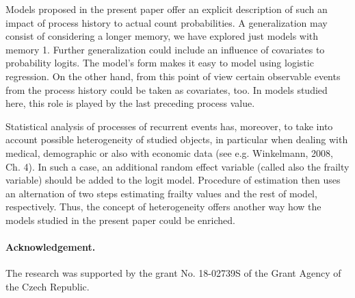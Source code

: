 \documentclass[11pt]{article}
\begin{document}
Models proposed in the present paper offer an explicit description
of such an impact of process history to actual count
probabilities. A generalization may consist of considering a
longer memory, we have explored just models with memory 1.
Further generalization could include an influence of covariates to
probability logits.
The model's form makes it easy to model using logistic regression.
On the other hand, from this point of view
certain observable events from the process history could be taken as covariates, too.
In models studied here, this role is played by the last preceding process value.

Statistical analysis of processes of recurrent events has,
moreover, to take into account possible heterogeneity of studied
objects, in particular when dealing with medical, demographic or
also with economic data (see e.g. Winkelmann, 2008, Ch. 4). In such
a case, an additional random effect variable (called also the
frailty variable) should be added to the logit model. Procedure of
estimation then uses an alternation of two steps estimating
frailty values and the rest of model, respectively. Thus, the concept of heterogeneity
offers another way how the models studied in the present paper could be enriched.

\paragraph{Acknowledgement.}
The research was supported by the grant No. 18-02739S of the Grant
Agency of the Czech Republic.
\end{document}
